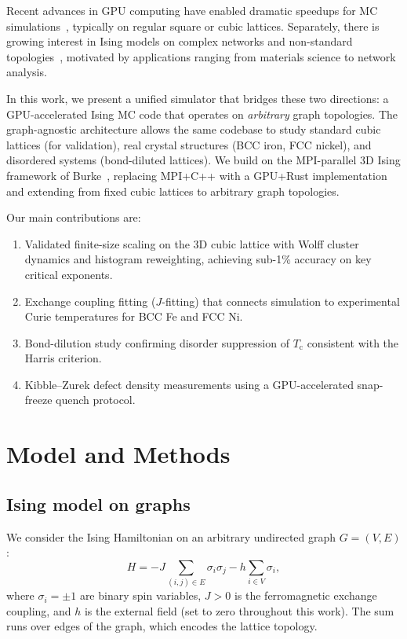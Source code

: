 \documentclass[twocolumn,showpacs,preprintnumbers,amsmath,amssymb,pra,floatfix]{revtex4-2}
\newcommand{\Tc}{T_{\mathrm{c}}}
\begin{document}
Recent advances in GPU computing have enabled dramatic speedups for MC
simulations~\cite{Preis2009,Block2010}, typically on regular square or cubic lattices.
Separately, there is growing interest in Ising models on complex networks and
non-standard topologies~\cite{Dorogovtsev2008,Krasnytska2023}, motivated by applications
ranging from materials science to network analysis.

In this work, we present a unified simulator that bridges these two directions:
a GPU-accelerated Ising MC code that operates on \emph{arbitrary} graph topologies.
The graph-agnostic architecture allows the same codebase to study standard cubic
lattices (for validation), real crystal structures (BCC iron, FCC nickel), and
disordered systems (bond-diluted lattices). We build on the MPI-parallel 3D Ising
framework of Burke~\cite{Burke2020}, replacing MPI+C++ with a GPU+Rust implementation
and extending from fixed cubic lattices to arbitrary graph topologies.

Our main contributions are:
\begin{enumerate}
\item Validated finite-size scaling on the 3D cubic lattice with Wolff cluster
      dynamics and histogram reweighting, achieving sub-1\% accuracy on key
      critical exponents.
\item Exchange coupling fitting ($J$-fitting) that connects simulation to
      experimental Curie temperatures for BCC Fe and FCC Ni.
\item Bond-dilution study confirming disorder suppression of $\Tc$ consistent
      with the Harris criterion.
\item Kibble--Zurek defect density measurements using a GPU-accelerated
      snap-freeze quench protocol.
\end{enumerate}

\section{Model and Methods}
\label{sec:methods}

\subsection{Ising model on graphs}

We consider the Ising Hamiltonian on an arbitrary undirected graph $G = (V, E)$:
\begin{equation}
    H = -J \sum_{(i,j) \in E} \sigma_i \sigma_j - h \sum_{i \in V} \sigma_i,
    \label{eq:hamiltonian}
\end{equation}
where $\sigma_i = \pm 1$ are binary spin variables, $J > 0$ is the ferromagnetic
exchange coupling, and $h$ is the external field (set to zero throughout this work).
The sum runs over edges of the graph, which encodes the lattice topology.
\end{document}
